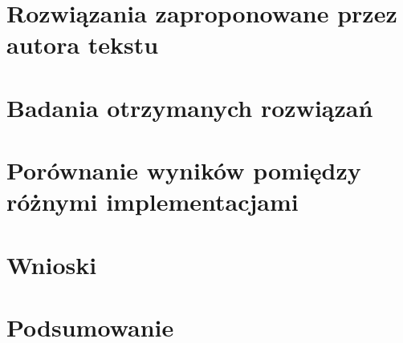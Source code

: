 \documentclass[mgr, pl, oneside, openright, final, openbib]{mgr}
\begin{document}
\chapter{Rozwiązania zaproponowane przez autora tekstu}
\newpage
\chapter{Badania otrzymanych rozwiązań}
\newpage
\chapter{Porównanie wyników pomiędzy różnymi implementacjami}
\newpage
\chapter{Wnioski}
\newpage
\chapter{Podsumowanie}
\listoffigures
\end{document}
